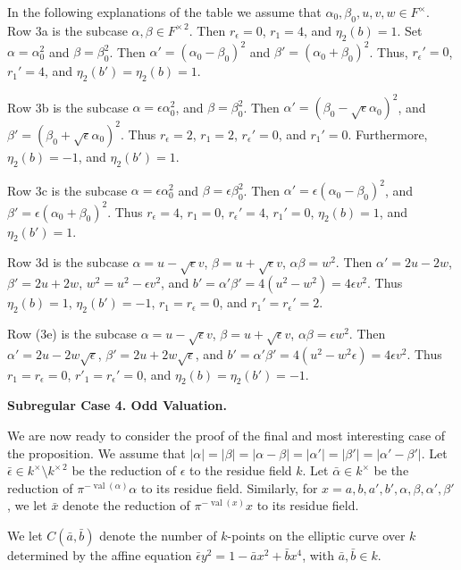 \documentclass{amsart}
\newcommand\val{\operatorname{val}}
\begin{document}
In the following explanations of the table 
we assume that $\alpha_0,\beta_0,u,v,w\in F^\times$.
Row 3a is the subcase $\alpha,\beta\in F^{\times\,2}$.  Then
$r_\epsilon=0$, $r_1=4$, and $\eta_2(b) = 1$.  Set $\alpha=\alpha_0^2$
and $\beta=\beta_0^2$.  Then $\alpha'=(\alpha_0-\beta_0)^2$ and
 $\beta'=
(\alpha_0+\beta_0)^2$.  Thus, $r_\epsilon'=0$, $r_1'=4$, and $\eta_2(b')=
\eta_2(b)=1$.

Row 3b is the subcase $\alpha=\epsilon\alpha_0^2$, and $\beta=\beta_0^2$.
Then $\alpha'=(\beta_0-\sqrt{\epsilon}\alpha_0)^2$, and $\beta'=(\beta_0+
\sqrt{\epsilon} \alpha_0)^2$.  Thus $r_\epsilon=2$, $r_1=2$,
$r_\epsilon'=0$, and $r_1'=0$. Furthermore, $\eta_2(b)=-1$, and
$\eta_2(b')=1$.

Row 3c is the subcase $\alpha=\epsilon\alpha_0^2$ and $\beta=\epsilon\beta_0^2$.
Then $\alpha'=\epsilon(\alpha_0-\beta_0)^2$, and $\beta'=\epsilon(\alpha_0+\beta_0)^2$.  
Thus $r_\epsilon=4$, $r_1=0$, $r_\epsilon'=4$, $r_1'=0$, 
$\eta_2(b) = 1$, and $\eta_2(b')=1$.

Row 3d is the subcase $\alpha=u-\sqrt{\epsilon}v$, $\beta=u+\sqrt{\epsilon}v$,
$\alpha\beta=w^2$.  Then $\alpha'=2u-2w$, $\beta'=2u+2w$, $w^2=u^2-\epsilon v^2$,
and $b'=\alpha'\beta'=4(u^2-w^2)=4\epsilon v^2$.  Thus
$\eta_2(b)=1$, $\eta_2(b')=-1$, $r_1=r_\epsilon=0$, and
$r_1'=r_\epsilon'=2$.

Row (3e) is the subcase $\alpha=u-\sqrt{\epsilon}v$,
 $\beta=u+\sqrt{\epsilon}v$,
$\alpha\beta=\epsilon w^2$.  Then $\alpha' = 2u-2w\sqrt{\epsilon}$,
$\beta'=2u+2w\sqrt{\epsilon}$, and $b'=\alpha'\beta'=4(u^2-w^2\epsilon) =
4 \epsilon v^2$.  Thus $r_1=r_\epsilon=0$, $r'_1=r_\epsilon'=0$, and
$\eta_2(b) = \eta_2(b') = -1$.

\bigskip
\centerline{\bf Subregular Case 4. Odd Valuation.}
\bigskip
We are now ready to consider the proof of the final and most interesting case
of the proposition.  We assume that $|\alpha|=|\beta|=|\alpha-\beta|=
|\alpha'|=|\beta'|=|\alpha'-\beta'|$.
Let $\bar\epsilon\in k^\times \setminus k^{\times\,2}$ be the reduction
of $\epsilon$ to the residue field $k$.  Let $\bar\alpha\in k^\times$
be the reduction of $\pi^{-\val(\alpha)}\alpha$ to its residue field.
Similarly, for $x=a,b,a',b',\alpha,\beta,\alpha',\beta'$, we let
$\bar x$ denote the reduction of $\pi^{-\val(x)}x$ to its residue
field.


We let $C(\bar a,\bar b)$ denote
the number of $k$-points on the elliptic curve over $k$
determined by the affine equation 
$\bar\epsilon y^2 = 1-\bar a x^2 + \bar b x^4$,
with $\bar a,\bar b\in k$. 
\end{document}
